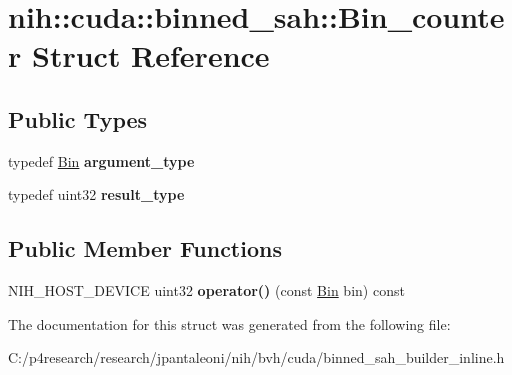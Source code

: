 \hypertarget{structnih_1_1cuda_1_1binned__sah_1_1_bin__counter}{
\section{nih\-:\-:cuda\-:\-:binned\-\_\-sah\-:\-:\-Bin\-\_\-counter \-Struct \-Reference}
\label{structnih_1_1cuda_1_1binned__sah_1_1_bin__counter}
}
\subsection*{\-Public \-Types}
\begin{DoxyCompactItemize}
\item 
\hypertarget{structnih_1_1cuda_1_1binned__sah_1_1_bin__counter_a40af21540c22b22a6ea522a747e0fdda}{
typedef \hyperlink{structnih_1_1cuda_1_1binned__sah_1_1_bin}{\-Bin} {\bfseries argument\-\_\-type}}
\label{structnih_1_1cuda_1_1binned__sah_1_1_bin__counter_a40af21540c22b22a6ea522a747e0fdda}

\item 
\hypertarget{structnih_1_1cuda_1_1binned__sah_1_1_bin__counter_ae59ba6322276be759d84f28c1e9a90d7}{
typedef uint32 {\bfseries result\-\_\-type}}
\label{structnih_1_1cuda_1_1binned__sah_1_1_bin__counter_ae59ba6322276be759d84f28c1e9a90d7}

\end{DoxyCompactItemize}
\subsection*{\-Public \-Member \-Functions}
\begin{DoxyCompactItemize}
\item 
\hypertarget{structnih_1_1cuda_1_1binned__sah_1_1_bin__counter_a2e828e650c3c0f4668f1f75b8b155822}{
\-N\-I\-H\-\_\-\-H\-O\-S\-T\-\_\-\-D\-E\-V\-I\-C\-E uint32 {\bfseries operator()} (const \hyperlink{structnih_1_1cuda_1_1binned__sah_1_1_bin}{\-Bin} bin) const }
\label{structnih_1_1cuda_1_1binned__sah_1_1_bin__counter_a2e828e650c3c0f4668f1f75b8b155822}

\end{DoxyCompactItemize}


\-The documentation for this struct was generated from the following file\-:\begin{DoxyCompactItemize}
\item 
\-C\-:/p4research/research/jpantaleoni/nih/bvh/cuda/binned\-\_\-sah\-\_\-builder\-\_\-inline.\-h\end{DoxyCompactItemize}
